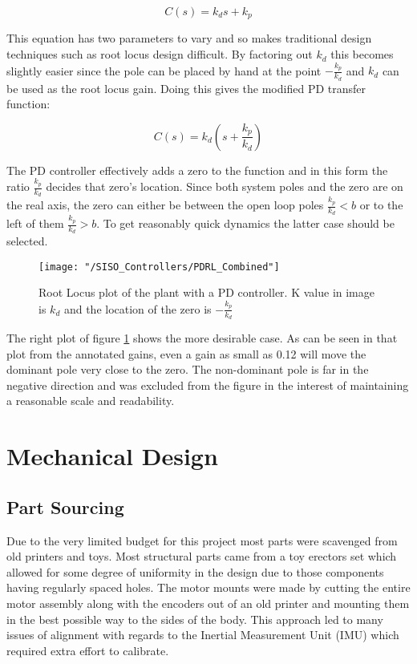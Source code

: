 \documentclass{article}
\begin{document}
	\begin{equation}
		\label{PDController}
		C(s) = k_d s + k_p
	\end{equation}
	
	This equation has two parameters to vary and so makes traditional design techniques such as root locus design difficult. By factoring out $k_d$ this becomes slightly easier since the pole can be placed by hand at the point $-\frac{k_p}{k_d}$ and $k_d$ can be used as the root locus gain. Doing this gives the modified PD transfer function:
	
	\begin{equation}
		\label{PDModified}
		C(s) = k_d (s + \frac{k_p}{k_d})
	\end{equation}
	
	The PD controller effectively adds a zero to the function and in this form the ratio $\frac{k_p}{k_d}$ decides that zero's location. Since both system poles and the zero are on the real axis, the zero can either be between the open loop poles $\frac{k_p}{k_d} < b$ or to the left of them $\frac{k_p}{k_d} > b$. To get reasonably quick dynamics the latter case should be selected. 
	
	\begin{figure}[h]
		\centerline{\texttt{[image: "/SISO\_Controllers/PDRL\_Combined"]}}
		\caption{Root Locus plot of the plant with a PD controller. K value in image is $k_d$ and the location of the zero is $-\frac{k_p}{k_d}$}
		\label{fig:PDRootLocus}
	\end{figure}
	
	The right plot of figure \ref{fig:PDRootLocus} shows the more desirable case. As can be seen in that plot from the annotated gains, even a gain as small as 0.12 will move the dominant pole very close to the zero. The non-dominant pole is far in the negative direction and was excluded from the figure in the interest of maintaining a reasonable scale and readability.

\section{Mechanical Design}
	\subsection{Part Sourcing}
	Due to the very limited budget for this project most parts were scavenged from old printers and toys. Most structural parts came from a toy erectors set which allowed for some degree of uniformity in the design due to those components having regularly spaced holes. The motor mounts were made by cutting the entire motor assembly along with the encoders out of an old printer and mounting them in the best possible way to the sides of the body. This approach led to many issues of alignment with regards to the Inertial Measurement Unit (IMU) which required extra effort to calibrate. 	
	
\end{document}
